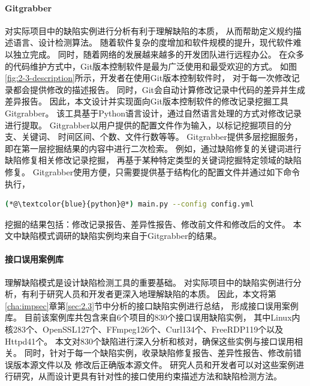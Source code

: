 \paragraph{Gitgrabber}
对实际项目中的缺陷实例进行分析有利于理解缺陷的本质，
从而帮助定义规约描述语言、设计检测算法。
随着软件复杂的度增加和软件规模的提升，现代软件难以独立完成。
同时，随着网络的发展越来越多的开发团队进行远程办公。
在众多的代码维护方式中，Git版本控制软件是最为广泛使用和最受欢迎的方式。
如图\ref{fig:2-3-description}所示，开发者在使用Git版本控制软件时，
对于每一次修改记录都会提供修改的描述报告。
同时，Git会自动计算修改记录中代码的差异并生成差异报告。
因此，本文设计并实现面向Git版本控制软件的修改记录挖掘工具Gitgrabber。
该工具基于Python语言设计，通过自然语言处理的方式对修改记录进行提取。
Gitgrabber以用户提供的配置文件作为输入，以标记挖掘项目的分支、关键词、
时间区间、个数、文件行数等等。
Gitgrabber提供多层挖掘服务，即在第一层挖掘结果的内容中进行二次检索。
例如，通过缺陷修复的关键词进行缺陷修复相关修改记录挖掘，
再基于某种特定类型的关键词挖掘特定领域的缺陷修复。
Gitgrabber使用方便，只需要提供基于结构化的配置文件并通过如下命令执行，
\begin{lstlisting}[language={bash},
basicstyle=\linespread{0.8}\listingsfont,
numbers=none,
xleftmargin=.3\textwidth]
(*@\textcolor{blue}{python}@*) main.py --config config.yml
\end{lstlisting}
挖掘的结果包括：修改记录报告、差异性报告、修改前文件和修改后的文件。
本文中缺陷模式调研的缺陷实例均来自于Gitgrabber的结果。

\paragraph{接口误用案例库}
理解缺陷模式是设计缺陷检测工具的重要基础。
对实际项目中的缺陷实例进行分析，有利于研究人员和开发者更深入地理解缺陷的本质。
因此，本文将第\ref{cha:impsec}章第\ref{sec:2.3}节中分析的接口缺陷实例进行总结，
形成接口误用案例库。
目前该案例库共包含来自6个项目的830个接口误用缺陷实例，
其中Linux内核283个、OpenSSL127个、FFmpeg126个、Curl134个、FreeRDP119个以及Httpd41个。
本文对830个缺陷进行深入分析和核对，确保这些实例与接口误用相关。
同时，针对于每一个缺陷实例，收录缺陷修复报告、差异性报告、修改前错误版本源文件以及
修改后正确版本源文件。
研究人员和开发者可以对这些案例进行研究，从而设计更具有针对性的接口使用约束描述方法和缺陷检测方法。


